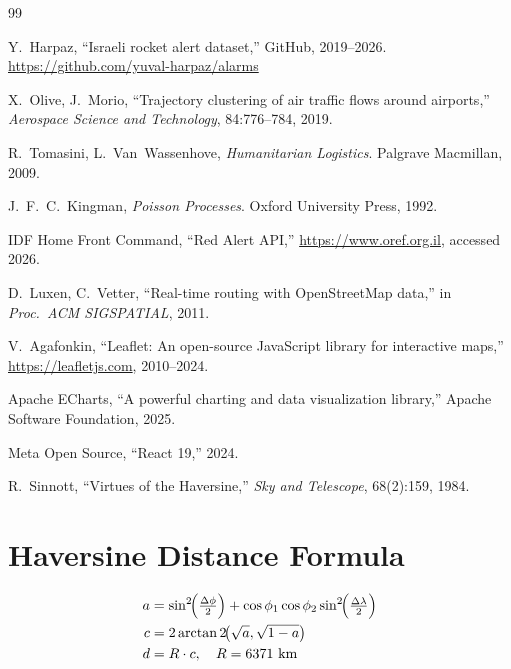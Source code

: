 \documentclass[12pt,a4paper]{article}
\begin{document}
\begin{thebibliography}{99}

Y.~Harpaz, ``Israeli rocket alert dataset,'' GitHub, 2019--2026.
\url{https://github.com/yuval-harpaz/alarms}

X.~Olive, J.~Morio,
``Trajectory clustering of air traffic flows around airports,''
\textit{Aerospace Science and Technology}, 84:776--784, 2019.

R.~Tomasini, L.~Van~Wassenhove,
\textit{Humanitarian Logistics}. Palgrave Macmillan, 2009.

J.~F.~C.~Kingman, \textit{Poisson Processes}. Oxford University Press, 1992.

IDF Home Front Command, ``Red Alert API,''
\url{https://www.oref.org.il}, accessed 2026.

D.~Luxen, C.~Vetter,
``Real-time routing with OpenStreetMap data,''
in \textit{Proc.\ ACM SIGSPATIAL}, 2011.

V.~Agafonkin,
``Leaflet: An open-source JavaScript library for interactive maps,''
\url{https://leafletjs.com}, 2010--2024.

Apache ECharts,
``A powerful charting and data visualization library,''
Apache Software Foundation, 2025.

Meta Open Source, ``React 19,'' 2024.

R.~Sinnott, ``Virtues of the Haversine,''
\textit{Sky and Telescope}, 68(2):159, 1984.

\end{thebibliography}

\appendix

\section{Haversine Distance Formula}
\label{app:haversine}
\begin{align}
  a &= \sin^2\!\Bigl(\tfrac{\Delta\phi}{2}\Bigr)
       +\cos\phi_1\cos\phi_2\sin^2\!\Bigl(\tfrac{\Delta\lambda}{2}\Bigr)\\
  c &= 2\arctan2\!\bigl(\sqrt{a},\sqrt{1-a}\bigr)\\
  d &= R\cdot c,\quad R=6371\text{ km}
\end{align}
\end{document}
